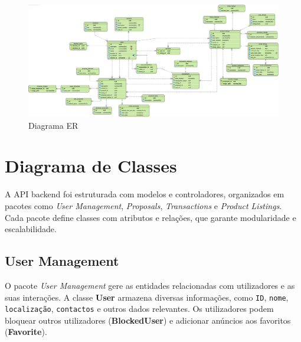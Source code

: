 \documentclass[a4paper, 12pt]{article} %
\begin{document}
\begin{figure}[ht]
	\centering
	\includegraphics[width=\textwidth]{../images/entity-relationship-diagram.png}
	\caption{Diagrama ER}
	\label{fig:diagrama_er}
\end{figure}


\clearpage
\newpage
\section{Diagrama de Classes}

A API backend foi estruturada com modelos e controladores, organizados em pacotes como \textit{User Management}, \textit{Proposals}, \textit{Transactions} e \textit{Product Listings}. Cada pacote define classes com atributos e relações, que garante modularidade e escalabilidade.

\subsection{User Management}
O pacote \textit{User Management} gere as entidades relacionadas com utilizadores e as suas interações. A classe \textbf{User} armazena diversas informações, como \verb*|ID|, \verb*|nome|, \verb*|localização|, \verb*|contactos| e outros dados relevantes. Os utilizadores podem bloquear outros utilizadores (\textbf{BlockedUser}) e adicionar anúncios aos favoritos (\textbf{Favorite}).
\end{document}
